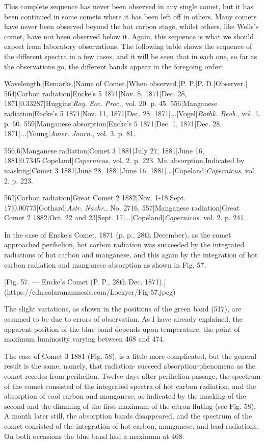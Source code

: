 \documentclass[a4paper, 12pt, oneside, polutonikogreek, english]{article}
\begin{document}
This complete sequence has never been observed in any single comet, but it has been continued in some comets where it has been left off in others. Many comets have never been observed beyond the hot carbon stage, whilst others, like Wells's comet, have not been observed below it. Again, this sequence is what we should expect from laboratory observations. The following table shows the sequence of the different spectra in a few cases, and it will be seen that in each one, so far as the observations go, the different bands appear in the foregoing order:

Wavelength.|Remarks.|Name of Comet.|When observed.|P. P.|P. D.|Observer.| 
564|Carbon radiation|Encke's 5 1871|Nov. 8, 1871|Dec. 28, 1871|0.33287|Huggins|\emph{Roy. Soc. Proc.}, vol. 20. p. 45. 
556|Manganese radiation|Encke's 5 1871|Nov. 11, 1871|Dec. 28, 1871|...|Vogel|\emph{Bothk. Beob.}, vol. 1. p. 60. 
559|Manganese absorption|Encke's 5 1871|Dec. 1, 1871|Dec. 28, 1871|...|Young|\emph{Amer. Journ.}, vol. 3. p. 81. 

556.6|Manganese radiation|Comet 3 1881|July 27, 1881|June 16, 1881|0.7345|Copeland|\emph{Copernicus}, vol. 2. p. 223. 
Mn absorption|Indicated by masking|Comet 3 1881|June 28, 1881|June 16, 1881|...|Copeland|\emph{Copernicus}, vol. 2. p. 223. 

562|Carbon radiation|Great Comet 2 1882|Nov. 1-18|Sept. 17|0.00775|Gothard|\emph{Astr. Nachr.}, No. 2716. 
557|Manganese radiation|Great Comet 2 1882|Oct. 22 and 23|Sept. 17|...|Copeland|\emph{Copernicus}, vol. 2. p. 241.

In the case of Encke's Comet, 1871 (p. p., 28th December), as the comet approached perihelion, hot carbon radiation was succeeded by the integrated radiations of hot carbon and manganese, and this again by the integration of hot carbon radiation and manganese absorption as shown in Fig. 57.

[Fig. 57. --- Encke's Comet (P. P., 28th Dec. 1871).](https://cdn.solaranamnesis.com/Lockyer/Fig-57.jpeg)

The slight variations, as shown in the positions of the green band (517), are assumed to be due to errors of observation. As I have already explained, the apparent position of the blue band depends upon temperature, the point of maximum luminosity varying between 468 and 474.

The case of Comet 3 1881 (Fig. 58), is a little more complicated, but the general result is the same, namely, that radiation- succeed absorption-phenomena as the comet recedes from perihelion. Twelve days after perihelion passage, the spectrum of the comet consisted of the integrated spectra of hot carbon radiation, and the absorption of cool carbon and manganese, as indicated by the masking of the second and the dimming of the first maximum of the citron fluting (see Fig. 58). A month later still, the absorption bands disappeared, and the spectrum of the comet consisted of the integration of hot carbon, manganese, and lead radiations. On both occasions the blue band had a maximum at 468.
\end{document}
